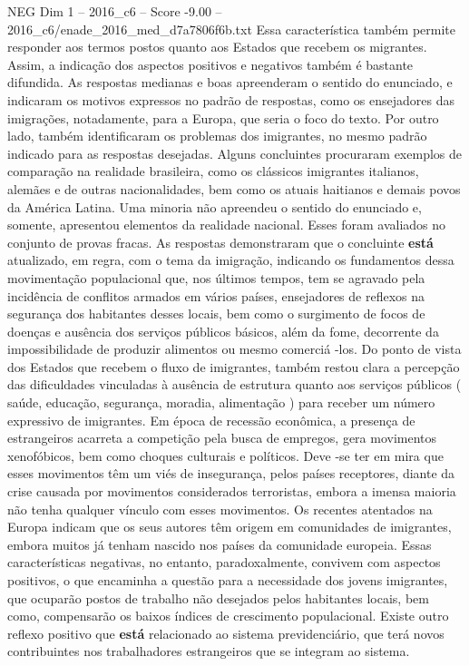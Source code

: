 \begin{textsample}{NEG Dim 1 – 2016\_c6 – Score -9.00 – 2016\_c6/enade\_2016\_med\_d7a7806f6b.txt}
Essa característica também permite responder aos termos postos quanto aos Estados que recebem os migrantes.
Assim, a indicação dos aspectos positivos e negativos também é bastante difundida.
As respostas medianas e boas apreenderam o sentido do enunciado, e indicaram os motivos expressos no padrão de respostas, como os ensejadores das imigrações, notadamente, para a Europa, que seria o foco do texto.
Por outro lado, também identificaram os problemas dos imigrantes, no mesmo padrão indicado para as respostas desejadas.
Alguns concluintes procuraram exemplos de comparação na realidade brasileira, como os clássicos imigrantes italianos, alemães e de outras nacionalidades, bem como os atuais haitianos e demais povos da América Latina.
Uma minoria não apreendeu o sentido do enunciado e, somente, apresentou elementos da realidade nacional.
Esses foram avaliados no conjunto de provas fracas.
As respostas demonstraram que o concluinte \textbf{está} atualizado, em regra, com o tema da imigração, indicando os fundamentos dessa movimentação populacional que, nos últimos tempos, tem se agravado pela incidência de conflitos armados em vários países, ensejadores de reflexos na segurança dos habitantes desses locais, bem como o surgimento de focos de doenças e ausência dos serviços públicos básicos, além da fome, decorrente da impossibilidade de produzir alimentos ou mesmo comerciá -los.
Do ponto de vista dos Estados que recebem o fluxo de imigrantes, também restou clara a percepção das dificuldades vinculadas à ausência de estrutura quanto aos serviços públicos ( saúde, educação, segurança, moradia, alimentação ) para receber um número expressivo de imigrantes.
Em época de recessão econômica, a presença de estrangeiros acarreta a competição pela busca de empregos, gera movimentos xenofóbicos, bem como choques culturais e políticos.
Deve -se ter em mira que esses movimentos têm um viés de insegurança, pelos países receptores, diante da crise causada por movimentos considerados terroristas, embora a imensa maioria não tenha qualquer vínculo com esses movimentos.
Os recentes atentados na Europa indicam que os seus autores têm origem em comunidades de imigrantes, embora muitos já tenham nascido nos países da comunidade europeia.
Essas características negativas, no entanto, paradoxalmente, convivem com aspectos positivos, o que encaminha a questão para a necessidade dos jovens imigrantes, que ocuparão postos de trabalho não desejados pelos habitantes locais, bem como, compensarão os baixos índices de crescimento populacional.
Existe outro reflexo positivo que \textbf{está} relacionado ao sistema previdenciário, que terá novos contribuintes nos trabalhadores estrangeiros que se integram ao sistema.

\end{textsample}
